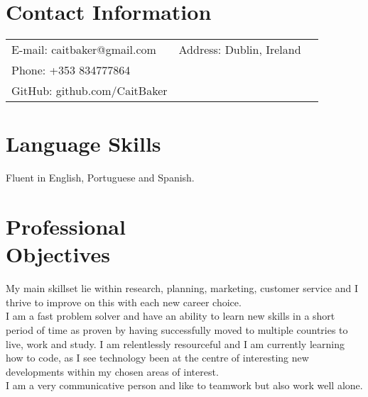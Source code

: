 \documentclass[margin,line]{resume}
\begin{document}
\begin{resume}

    \section{\mysidestyle Contact Information}

    \begin{tabular}{ l c l}
    E-mail: caitbaker@gmail.com & Address: Dublin, Ireland\\
    Phone: +353 834777864\\
    GitHub: github.com/CaitBaker\\
    \end{tabular}

    \section{\mysidestyle Language Skills}
    Fluent in English, Portuguese and Spanish.

    \section{\mysidestyle Professional \\ Objectives}
    My main skillset lie within research, planning, marketing, customer service and I thrive to improve on this with each new career choice.\vspace{1mm}\\%
    I am a fast problem solver and have an ability to learn new skills in a short period of time as proven by having successfully moved to multiple countries to live, work and study. I am relentlessly resourceful and I am currently learning how to code, as I see technology been at the centre of interesting new developments within my chosen areas of interest.\vspace{1mm}\\%
    I am a very communicative person and like to teamwork but also work well alone.\vspace*{1mm}\\%
    

\end{resume}
\end{document}
